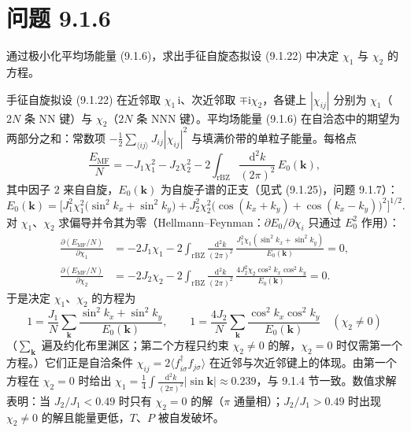 \section*{问题 9.1.6}
\begin{problem}
通过极小化平均场能量 (9.1.6)，求出手征自旋态拟设 (9.1.22) 中决定 $\chi_1$ 与 $\chi_2$ 的方程。
\end{problem}
\solution
手征自旋拟设 (9.1.22) 在近邻取 $\chi_1\,\mathrm{i}$、次近邻取 $\mp\mathrm{i}\chi_2$，各键上 $|\chi_{ij}|$ 分别为 $\chi_1$（$2N$ 条 NN 键）与 $\chi_2$（$2N$ 条 NNN 键）。平均场能量 (9.1.6) 在自洽态中的期望为两部分之和：常数项 $-\frac12\sum_{\langle ij\rangle}J_{ij}|\chi_{ij}|^2$ 与填满价带的单粒子能量。每格点
\begin{equation*}
\frac{E_{\text{MF}}}{N}=-J_1\chi_1^{2}-J_2\chi_2^{2}
-2\int_{\text{rBZ}}\frac{\mathrm{d}^{2}k}{(2\pi)^{2}}\,E_{0}(\pmb{k}) ,
\end{equation*}
其中因子 $2$ 来自自旋，$E_0(\pmb{k})$ 为自旋子谱的正支（见式 (9.1.25)，问题 9.1.7）：
\begin{equation*}
E_{0}(\pmb{k})=\Big[J_1^{2}\chi_1^{2}\big(\sin^{2}k_x+\sin^{2}k_y\big)
+J_2^{2}\chi_2^{2}\big(\cos(k_x+k_y)+\cos(k_x-k_y)\big)^{2}\Big]^{1/2} .
\end{equation*}
对 $\chi_1$、$\chi_2$ 求偏导并令其为零（Hellmann--Feynman：$\partial E_0/\partial\chi_i$ 只通过 $E_0^2$ 作用）：
\begin{align*}
\frac{\partial(E_{\text{MF}}/N)}{\partial\chi_1}
&=-2J_1\chi_1-2\int_{\text{rBZ}}\frac{\mathrm{d}^{2}k}{(2\pi)^{2}}\,
\frac{J_1^{2}\chi_1(\sin^{2}k_x+\sin^{2}k_y)}{E_0(\pmb{k})}=0 ,\\
\frac{\partial(E_{\text{MF}}/N)}{\partial\chi_2}
&=-2J_2\chi_2-2\int_{\text{rBZ}}\frac{\mathrm{d}^{2}k}{(2\pi)^{2}}\,
\frac{4J_2^{2}\chi_2\cos^{2}k_x\cos^{2}k_y}{E_0(\pmb{k})}=0 .
\end{align*}
于是决定 $\chi_1$、$\chi_2$ 的方程为
\begin{equation*}
\boxed{\;
1=\frac{J_1}{N}\sum_{\pmb{k}}\frac{\sin^{2}k_x+\sin^{2}k_y}{E_0(\pmb{k})},\qquad
1=\frac{4J_2}{N}\sum_{\pmb{k}}\frac{\cos^{2}k_x\cos^{2}k_y}{E_0(\pmb{k})}
\quad(\chi_2\neq0)\;}
\end{equation*}
（$\sum_{\pmb{k}}$ 遍及约化布里渊区；第二个方程只约束 $\chi_2\neq0$ 的解，$\chi_2=0$ 时仅需第一个方程。）它们正是自洽条件 $\chi_{ij}=2\langle f^{\dagger}_{i\sigma}f_{j\sigma}\rangle$ 在近邻与次近邻键上的体现。由第一个方程在 $\chi_2=0$ 时给出 $\chi_1=\frac14\int\frac{\mathrm{d}^2k}{(2\pi)^2}|\sin\pmb{k}|\approx0.239$，与 9.1.4 节一致。数值求解表明：当 $J_2/J_1<0.49$ 时只有 $\chi_2=0$ 的解（$\pi$ 通量相）；$J_2/J_1>0.49$ 时出现 $\chi_2\neq0$ 的解且能量更低，$T$、$P$ 被自发破坏。

